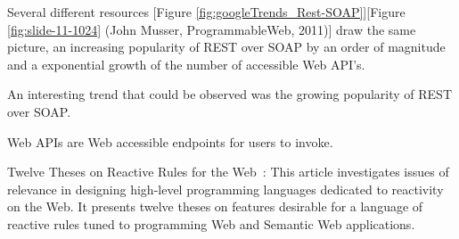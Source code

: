 Several different resources [Figure \ref{fig:googleTrends_Rest-SOAP}][Figure \ref{fig:slide-11-1024} (John Musser, ProgrammableWeb, 2011)] draw the same picture, an increasing popularity of REST over SOAP by an order of magnitude and a exponential growth of the number of accessible Web API's.

An interesting trend that could be observed was the growing popularity of REST over SOAP.~\cite{ploscar2012xml}




Web APIs are Web accessible endpoints for users to invoke.

Twelve Theses on Reactive Rules for the Web~\cite{10.1007-11896548_63}:
This article investigates issues of relevance in designing high-level
programming languages dedicated to reactivity on the Web. It presents
twelve theses on features desirable for a language of reactive rules tuned
to programming Web and Semantic Web applications.
